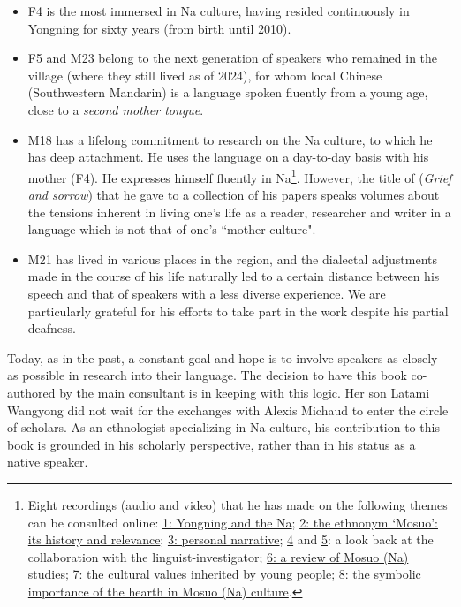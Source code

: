 \begin{itemize}
    \item F4 is the most immersed in Na culture, having resided continuously in Yongning for sixty years (from birth until 2010).
    \item F5 and M23 belong to the next generation of speakers who remained in the village (where they still lived as of 2024), for whom local Chinese (Southwestern Mandarin) is a language spoken fluently from a young age, close to a \emph{second mother tongue}.
    \item M18 has a lifelong commitment to research on the Na culture, to which he has deep attachment. He uses the language on a day-to-day basis with his mother (F4). He expresses himself fluently in Na\footnote{Eight recordings (audio and video) that he has made on the following themes can be consulted online:
    \href{https://doi.org/10.24397/pangloss-0007734}{1: Yongning and the Na}; \href{https://doi.org/10.24397/pangloss-0007740}{2: the ethnonym `Mosuo': its history and relevance}; \href{https://doi.org/10.24397/pangloss-0007730}{3: personal narrative}; \href{https://doi.org/10.24397/pangloss-0007736}{4} and \href{https://doi.org/10. 24397/pangloss-0007738}{5}: a look back at the collaboration with the linguist-investigator; \href{https://doi.org/10.24397/pangloss-0007742}{6: a review of Mosuo (Na) studies}; \href{https://doi.org/10.24397/pangloss-0007728}{7: the cultural values inherited by young people}; \href{https://doi.org/10.24397/pangloss-0007732}{8: the symbolic importance of the hearth in Mosuo (Na) culture}.}.
    However, the title of  (\emph{Grief and sorrow}) that he gave to a collection of his papers \parencite{latami2016} speaks volumes about the tensions inherent in living one's life as a reader, researcher and writer in a language which is not that of one's ``mother culture".
    \item M21 has lived in various places in the region, and the dialectal adjustments made in the course of his life naturally led to a certain distance between his speech and that of speakers with a less diverse experience. We are particularly grateful for his efforts to take part in the work despite his partial deafness.
\end{itemize}

Today, as in the past, a constant goal and hope is to involve speakers as closely as possible in research into their language. The decision to have this book co-authored by the main consultant is in keeping with this logic. Her son Latami Wangyong did not wait for the exchanges with Alexis Michaud to enter the circle of scholars. As an ethnologist specializing in Na culture, his contribution to this book is grounded in his scholarly perspective, rather than in his status as a native speaker.

